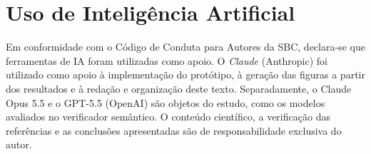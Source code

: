 \documentclass[12pt]{article}
\begin{document}
\section*{Uso de Inteligência Artificial}
\label{Sec:IA}
{
\small
Em conformidade com o Código de Conduta para Autores da SBC, declara-se que ferramentas de IA foram utilizadas como apoio. O \textit{Claude} (Anthropic) foi utilizado como apoio à implementação do protótipo, à geração das figuras a partir dos resultados e à redação e organização deste texto. Separadamente, o Claude Opus 5.5 e o GPT-5.5 (OpenAI) são objetos do estudo, como os modelos avaliados no verificador semântico. O conteúdo científico, a verificação das referências e as conclusões apresentadas são de responsabilidade exclusiva do autor.
}



\end{document}

